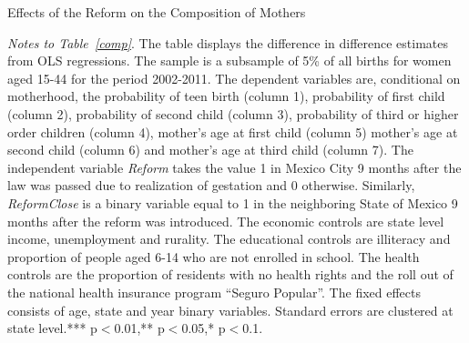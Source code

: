 \documentclass[a4paper, 11pt]{article}
\begin{document}
\begin{spacing}{2}
\setcounter{table}{5}
\begin{table}\caption{Effects of the Reform on the Composition of Mothers}\label{comp}
  \centering
\begin{threeparttable}

\begin{tablenotes}
\footnotesize
\item \textit{Notes to Table~\ref{comp}}. The table displays the difference in difference estimates from OLS regressions. The sample is a subsample of 5\% of all births for women aged 15-44 for the period 2002-2011. The dependent variables are, conditional on motherhood, the probability of teen birth (column 1), probability of first child (column 2), probability of second child (column 3), probability of third or higher order children (column 4), mother's age at first child (column 5) mother's age at second child (column 6) and mother's age at third child (column 7). The independent variable \textit{Reform} takes the value 1 in Mexico City 9 months after the law was passed due to realization of gestation and 0 otherwise. Similarly, \textit{ReformClose} is a binary variable equal to 1 in the neighboring State of Mexico 9 months after the reform was introduced. The economic controls are state level income, unemployment and rurality. The educational controls are illiteracy and proportion of people aged 6-14 who are not enrolled in school. The health controls are the proportion of residents with no health rights and the roll out of the national health insurance program ``Seguro Popular''. The fixed effects consists of age, state and year binary variables. Standard errors are clustered at state level.*** p$<$0.01,** p$<$0.05,* p$<$0.1.
\end{tablenotes} 
\end{threeparttable}
 \end{table} 
 

\end{spacing}
\end{document}
